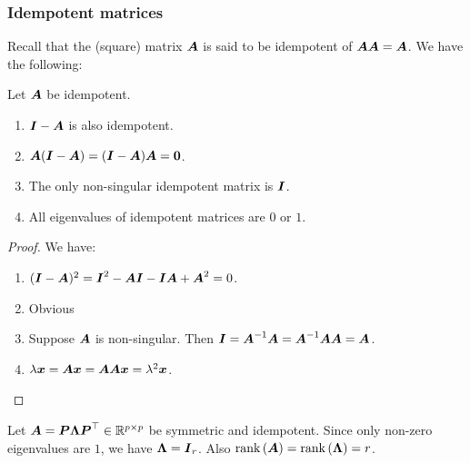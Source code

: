 \subsubsection{Idempotent matrices}
Recall that the (square) matrix $\mA$ is said to be idempotent of $\mA\mA=\mA$. We have the following:
\begin{proposition}
    Let $\mA$ be idempotent.
    \begin{enumerate}
        \item $\mI-\mA$ is also idempotent.
        \item $\mA(\mI-\mA)=(\mI-\mA)\mA=\zero$.
        \item The only non-singular idempotent matrix is $\mI$.
        \item All eigenvalues of idempotent matrices are $0$ or $1$.
    \end{enumerate}
\end{proposition}
\begin{proof}
    We have:
    \begin{enumerate}
        \item $(\mI-\mA)^2=\mI^2-\mA\mI-\mI\mA+\mA^2=0$.
        \item Obvious
        \item Suppose $\mA$ is non-singular. Then $\mI=\mA^{-1}\mA=\mA^{-1}\mA\mA=\mA$.
        \item $\lambda\x=\mA\x=\mA\mA\x=\lambda^2\x$.
    \end{enumerate}
\end{proof}
Let $\mA=\boldsymbol{P}\boldsymbol{\Lambda}\boldsymbol{P}^\top\in\R^{p\times p}$ be symmetric and idempotent. Since only non-zero eigenvalues are $1$, we have $\mL=\mI_r$.
Also $\rank{\mA} = \rank{\boldsymbol{\Lambda}} = r$.

